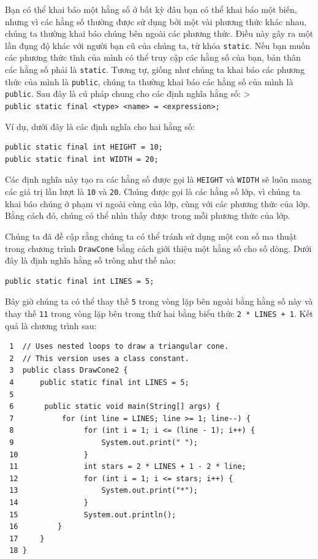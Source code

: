 Bạn có thể khai báo một hằng số ở bất kỳ đâu bạn có thể khai báo một
biến, nhưng vì các hằng số thường được sử dụng bởi một vài phương thức
khác nhau, chúng ta thường khai báo chúng bên ngoài các phương thức.
Điều này gây ra một lần đụng độ khác với người bạn cũ của chúng ta, từ
khóa \texttt{static}. Nếu bạn muốn các phương thức tĩnh của mình có thể
truy cập các hằng số của bạn, bản thân các hằng số phải là
\texttt{static}. Tương tự, giống như chúng ta khai báo các phương thức
của mình là \texttt{public}, chúng ta thường khai báo các hằng số của
mình là \texttt{public}. Sau đây là cú pháp chung cho các định nghĩa
hằng số: \textgreater{}
\texttt{public\ static\ final\ \textless{}type\textgreater{}\ \textless{}name\textgreater{}\ =\ \textless{}expression\textgreater{};}

Ví dụ, dưới đây là các định nghĩa cho hai hằng số:

\begin{verbatim}
public static final int HEIGHT = 10;
public static final int WIDTH = 20;
\end{verbatim}

Các định nghĩa này tạo ra các hằng số được gọi là \texttt{HEIGHT} và
\texttt{WIDTH} sẽ luôn mang các giá trị lần lượt là \texttt{10} và
\texttt{20}. Chúng được gọi là các hằng số lớp, vì chúng ta khai báo
chúng ở phạm vi ngoài cùng của lớp, cùng với các phương thức của lớp.
Bằng cách đó, chúng có thể nhìn thấy được trong mỗi phương thức của lớp.

Chúng ta đã đề cập rằng chúng ta có thể tránh sử dụng một con số ma
thuật trong chương trình \texttt{DrawCone} bằng cách giới thiệu một hằng
số cho số dòng. Dưới đây là định nghĩa hằng số trông như thế nào:

\begin{verbatim}
public static final int LINES = 5;
\end{verbatim}

Bây giờ chúng ta có thể thay thế \texttt{5} trong vòng lặp bên ngoài
bằng hằng số này và thay thế \texttt{11} trong vòng lặp bên trong thứ
hai bằng biểu thức \texttt{2\ *\ LINES\ +\ 1}. Kết quả là chương trình
sau:

\begin{verbatim}
 1  // Uses nested loops to draw a triangular cone.
 2  // This version uses a class constant.
 3  public class DrawCone2 {
 4      public static final int LINES = 5;
 5
 6       public static void main(String[] args) {
 7           for (int line = LINES; line >= 1; line--) {
 8                for (int i = 1; i <= (line - 1); i++) {
 9                    System.out.print(" ");
 10               }
 11               int stars = 2 * LINES + 1 - 2 * line;
 12               for (int i = 1; i <= stars; i++) {
 13                   System.out.print("*");
 14               }
 15               System.out.println();
 16         }
 17     }
 18 }
\end{verbatim}

